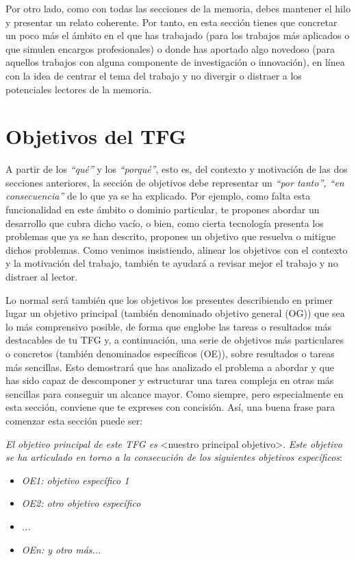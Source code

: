 Por otro lado, como con todas las secciones de la memoria, debes mantener el hilo y presentar un relato coherente. Por tanto, en esta sección tienes que concretar un poco más el ámbito en el que has trabajado (para los trabajos más aplicados o que simulen encargos profesionales) o donde has aportado algo novedoso (para aquellos trabajos con alguna componente de investigación o innovación), en línea con la idea de centrar el tema del trabajo y no divergir o distraer a los potenciales lectores de la memoria.

\section{Objetivos del TFG}
A partir de los \textit{``qué''} y los \textit{``porqué''}, esto es, del contexto y motivación de las dos secciones anteriores, la sección de objetivos debe representar un \textit{``por tanto'', ``en consecuencia''} de lo que ya se ha explicado. Por ejemplo, como falta esta funcionalidad en este ámbito o dominio particular, te propones abordar un desarrollo que cubra dicho vacío, o bien, como cierta tecnología presenta los problemas que ya se han descrito, propones un objetivo que resuelva o mitigue dichos problemas. Como venimos insistiendo, alinear los objetivos con el contexto y la motivación del trabajo, también te ayudará a revisar mejor el trabajo y no distraer al lector.

Lo normal será también que los objetivos los presentes describiendo en primer lugar un objetivo principal (también denominado objetivo general (OG)) que sea lo más comprensivo posible, de forma que englobe las tareas o resultados más destacables de tu TFG y,  a continuación, una serie de objetivos más particulares o concretos (también denominados específicos (OE)), sobre resultados o tareas más sencillas. Esto demostrará que has analizado el problema a abordar y que has sido capaz de descomponer y estructurar una tarea compleja en otras más sencillas para conseguir un alcance mayor. Como siempre, pero especialmente en esta sección, conviene que te expreses con concisión. Así, una buena frase para comenzar esta sección puede ser:

\textit{El objetivo principal de este TFG es } \textless nuestro principal objetivo\textgreater. \textit{Este objetivo se ha articulado en torno a la consecución de los siguientes objetivos específicos}:
\begin{itemize}
  \item \textit{OE1: objetivo específico 1}
  \item \textit{OE2: otro objetivo específico}
  \item \textit{...}
  \item \textit{OEn: y otro más...}
\end{itemize}


